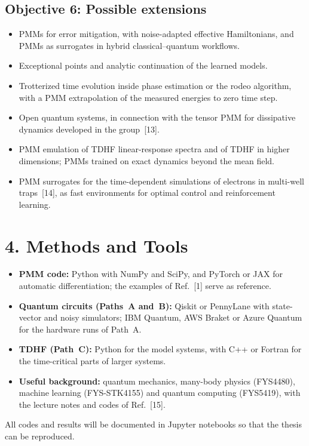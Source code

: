 \documentclass[12pt,a4paper]{article}
\begin{document}
\subsection*{Objective 6: Possible extensions}
\begin{itemize}
  \item PMMs for error mitigation, with noise-adapted effective
  Hamiltonians, and PMMs as surrogates in hybrid classical--quantum
  workflows.
  \item Exceptional points and analytic continuation of the learned
  models.
  \item Trotterized time evolution inside phase estimation or the
  rodeo algorithm, with a PMM extrapolation of the measured energies
  to zero time step.
  \item Open quantum systems, in connection with the tensor PMM for
  dissipative dynamics developed in the group~[13].
  \item PMM emulation of TDHF linear-response spectra and of TDHF in
  higher dimensions; PMMs trained on exact dynamics beyond the mean
  field.
  \item PMM surrogates for the time-dependent simulations of electrons
  in multi-well traps~[14], as fast environments for optimal control
  and reinforcement learning.
\end{itemize}

\section*{4. Methods and Tools}

\begin{itemize}
  \item \textbf{PMM code:} Python with NumPy and SciPy, and PyTorch or
  JAX for automatic differentiation; the examples of Ref.~[1] serve
  as reference.
  \item \textbf{Quantum circuits (Paths~A and~B):} Qiskit or
  PennyLane with state-vector and noisy simulators; IBM Quantum, AWS
  Braket or Azure Quantum for the hardware runs of Path~A.
  \item \textbf{TDHF (Path~C):} Python for the model systems, with
  C++ or Fortran for the time-critical parts of larger systems.
  \item \textbf{Useful background:} quantum mechanics, many-body
  physics (FYS4480), machine learning (FYS-STK4155) and quantum
  computing (FYS5419), with the lecture notes and codes of
  Ref.~[15].
\end{itemize}
All codes and results will be documented in Jupyter notebooks so that
the thesis can be reproduced.
\end{document}
